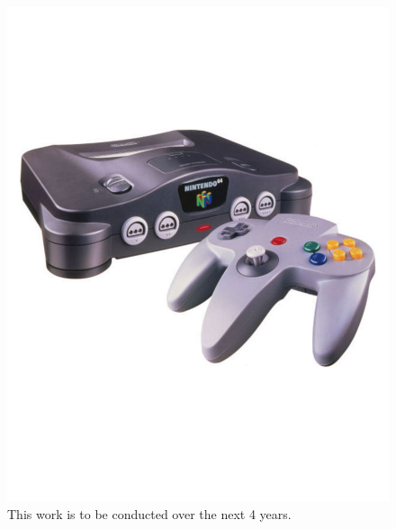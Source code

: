 \documentclass[final]{beamer}
\begin{document}
\begin{frame}[plain]{}
\begin{center}
\begin{minipage}[t]{.23\linewidth}
	\vspace{1.25cm}
			{\Large {}}
		\begin{figure} \def\figurename{Fig.}
		\centering
	    \includegraphics[width=\textwidth, trim=60 190 0 190, clip]{./figs/n64} \vspace*{-2.0cm}
		\caption{This work is to be conducted over the next 4 years.}
		\label{fig:PMF}
	      \end{figure}

	\end{minipage}
	
    \end{center}
    
  \end{frame}  
\end{document}
